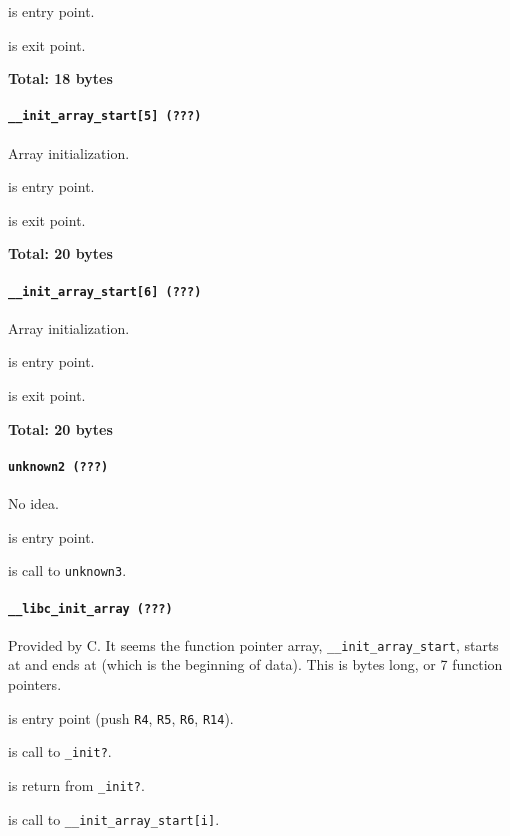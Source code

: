  is entry point.

 is exit point.

\textbf{Total: 18 bytes}

\paragraph{\texttt{\_\_init\_array\_start[5] (???)}} Array initialization.

 is entry point.

 is exit point.

\textbf{Total: 20 bytes}

\paragraph{\texttt{\_\_init\_array\_start[6] (???)}} Array initialization.

 is entry point.

 is exit point.

\textbf{Total: 20 bytes}

\paragraph{\texttt{unknown2 (???)}} No idea.

 is entry point.

 is call to \texttt{unknown3}.

\paragraph{\texttt{\_\_libc\_init\_array (???)}} Provided by C. It seems the
function pointer array,  \texttt{\_\_init\_array\_start}, starts at
 and ends at  (which is the beginning of
data). This is  bytes long, or 7 function pointers.

 is entry point (push \texttt{R4}, \texttt{R5},
\texttt{R6}, \texttt{R14}).

 is call to \texttt{\_init?}.

 is return from \texttt{\_init?}.

 is call to \texttt{\_\_init\_array\_start[i]}.

